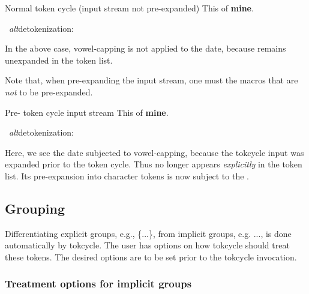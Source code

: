 \documentclass[10pt]{article}
\def\altdecytoks{\par\medskip\begingroup\noindent\macname{cytoks}
  \ \textit{alt}detokenization:\\\raggedright\footnotesize\ttfamily
  \expandafter\altdetokenize\expandafter{\the\cytoks}\normalsize\par
  \endgroup\medskip}
\newcommand\TokCycle{\textsf{tokcycle}}
\begin{document}
\begingroup
{}

\noindent\begin{minipage}[t]{\textwidth}
\begin{exampleA}[lefthand width=5.5cm]{Normal token cycle (input stream
  not pre-expanded)}
\tokcycle
{}
{}
{}
{}%
{This  of 
  {\bfseries mine}.}
\the\cytoks
\end{exampleA}

\altdecytoks

In the above case, vowel-capping is not applied to the date, because
   remains unexpanded in the  token list.

\noindent\hrulefill\strut
\end{minipage}

Note that, when pre-expanding the input stream, one must 
   the macros that are \textit{not} 
  to be pre-expanded.

\begin{exampleA}[lefthand width=5.5cm]{Pre- token cycle
  input stream}
\expandedtokcyclexpress
{This \noexpand{} of 
  {\noexpand\bfseries mine}.}
\the\cytoks
\end{exampleA}

\altdecytoks

Here, we see the date subjected to vowel-capping, because the \TokCycle{}
  input was expanded prior to the token cycle.
Thus  no longer appears \textit{explicitly} in the 
   token list.
Its pre-expansion into character tokens is now subject to the 
  .

\endgroup

\subsection{Grouping}

Differentiating explicit groups, e.g., \{...\}, from
  implicit groups, e.g. ...,
  is done automatically by \TokCycle.
The user has options on how \TokCycle{} should treat these tokens.
The desired options are to be set prior to the \TokCycle{} invocation.


\subsubsection{Treatment options for implicit groups}
\end{document}
